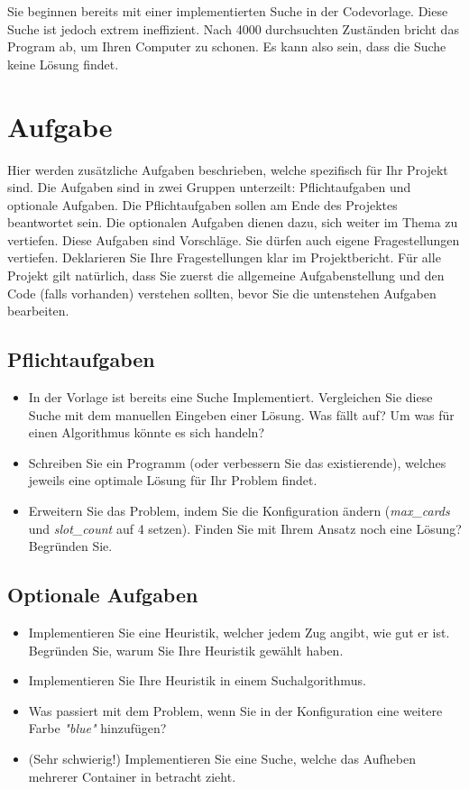 \documentclass[a4paper,11pt,german,notitlepage]{report}
\begin{document}
Sie beginnen bereits mit einer implementierten Suche in der Codevorlage.
Diese Suche ist jedoch extrem ineffizient.
Nach 4000 durchsuchten Zuständen bricht das Program ab, um Ihren Computer zu schonen.
Es kann also sein, dass die Suche keine Lösung findet.

\section*{Aufgabe}
Hier werden zusätzliche Aufgaben beschrieben, welche spezifisch für Ihr Projekt sind.
Die Aufgaben sind in zwei Gruppen unterzeilt: Pflichtaufgaben und optionale Aufgaben.
Die Pflichtaufgaben sollen am Ende des Projektes beantwortet sein.
Die optionalen Aufgaben dienen dazu, sich weiter im Thema zu vertiefen.
Diese Aufgaben sind Vorschläge. Sie dürfen auch eigene Fragestellungen vertiefen.
Deklarieren Sie Ihre Fragestellungen klar im Projektbericht.
Für alle Projekt gilt natürlich, dass Sie zuerst die allgemeine Aufgabenstellung und den Code (falls vorhanden) verstehen sollten, bevor Sie die untenstehen Aufgaben bearbeiten.
\subsection*{Pflichtaufgaben}
\begin{itemize}
    \item In der Vorlage ist bereits eine Suche Implementiert. Vergleichen Sie diese Suche mit dem manuellen Eingeben einer Lösung. Was fällt auf? Um was für einen Algorithmus könnte es sich handeln?
    \item Schreiben Sie ein Programm (oder verbessern Sie das existierende), welches jeweils eine optimale Lösung für Ihr Problem findet.
    \item Erweitern Sie das Problem, indem Sie die Konfiguration ändern (\textit{max\_cards} und \textit{slot\_count} auf 4 setzen). Finden Sie mit Ihrem Ansatz noch eine Lösung? Begründen Sie.
\end{itemize}
\subsection*{Optionale Aufgaben}
\begin{itemize}
    \item Implementieren Sie eine Heuristik, welcher jedem Zug angibt, wie gut er ist. Begründen Sie, warum Sie Ihre Heuristik gewählt haben.
    \item Implementieren Sie Ihre Heuristik in einem Suchalgorithmus.
    \item Was passiert mit dem Problem, wenn Sie in der Konfiguration eine weitere Farbe \textit{"blue"} hinzufügen?
    \item (Sehr schwierig!) Implementieren Sie eine Suche, welche das Aufheben mehrerer Container in betracht zieht.
\end{itemize}
\end{document}
